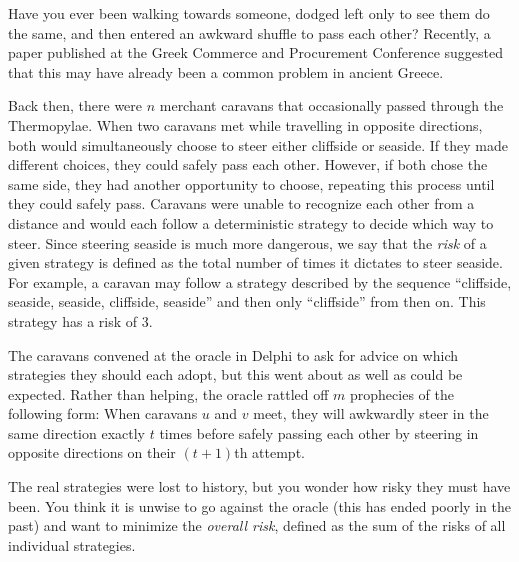 






Have you ever been walking towards someone, dodged left only to see them do the same, and then entered an awkward shuffle to pass each other?
Recently, a paper published at the Greek Commerce and Procurement Conference suggested that this may have already been a common problem in ancient Greece.

Back then, there were $n$ merchant caravans that occasionally passed through the Thermopylae.
When two caravans met while travelling in opposite directions, both would simultaneously choose to steer either cliffside or seaside.
If they made different choices, they could safely pass each other.
However, if both chose the same side, they had another opportunity to choose, repeating this process until they could safely pass.
Caravans were unable to recognize each other from a distance and would each follow a deterministic strategy to decide which way to steer.
Since steering seaside is much more dangerous, we say that the \emph{risk} of a given strategy is defined as the total number of times it dictates to steer seaside.
For example, a caravan may follow a strategy described by the sequence ``cliffside, seaside, seaside, cliffside, seaside'' and then only ``cliffside'' from then on.
This strategy has a risk of $3$.

The caravans convened at the oracle in Delphi to ask for advice on which strategies they should each adopt, but this went about as well as could be expected. Rather than helping, the oracle rattled off $m$ prophecies of the following form: When caravans $u$ and $v$ meet, they will awkwardly steer in the same direction exactly $t$ times before safely passing each other by steering in opposite directions on their $(t + 1)$th attempt.

The real strategies were lost to history, but you wonder how risky they must have been. You think it is unwise to go against the oracle (this has ended poorly in the past) and want to minimize the \emph{overall risk}, defined as the sum of the risks of all individual strategies.

